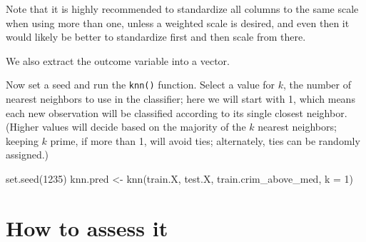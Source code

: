 \documentclass[
]{book}
\newenvironment{Shaded}{\begin{snugshade}}{\end{snugshade}}
\newcommand{\AttributeTok}[1]{\textcolor[rgb]{0.77,0.63,0.00}{#1}}
\newcommand{\CommentTok}[1]{\textcolor[rgb]{0.56,0.35,0.01}{\textit{#1}}}
\newcommand{\DecValTok}[1]{\textcolor[rgb]{0.00,0.00,0.81}{#1}}
\newcommand{\FunctionTok}[1]{\textcolor[rgb]{0.00,0.00,0.00}{#1}}
\newcommand{\NormalTok}[1]{#1}
\newcommand{\OtherTok}[1]{\textcolor[rgb]{0.56,0.35,0.01}{#1}}
\newcommand{\SpecialCharTok}[1]{\textcolor[rgb]{0.00,0.00,0.00}{#1}}
\begin{document}
Note that it is highly recommended to standardize all columns to the same scale when using more than one, unless a weighted scale is desired, and even then it would likely be better to standardize first and then scale from there.

\begin{Shaded}
\end{Shaded}

We also extract the outcome variable into a vector.

\begin{Shaded}
\end{Shaded}

Now set a seed and run the \texttt{knn()} function. Select a value for \(k\), the number of nearest neighbors to use in the classifier; here we will start with 1, which means each new observation will be classified according to its single closest neighbor. (Higher values will decide based on the majority of the \(k\) nearest neighbors; keeping \(k\) prime, if more than 1, will avoid ties; alternately, ties can be randomly assigned.)

\begin{Shaded}
\begin{Highlighting}[]
\FunctionTok{set.seed}\NormalTok{(}\DecValTok{1235}\NormalTok{)}
\NormalTok{knn.pred }\OtherTok{\textless{}{-}} \FunctionTok{knn}\NormalTok{(train.X, test.X, train.crim\_above\_med, }\AttributeTok{k =} \DecValTok{1}\NormalTok{)}
\end{Highlighting}
\end{Shaded}

\hypertarget{how-to-assess-it-6}{%
\section{How to assess it}\label{how-to-assess-it-6}}
\end{document}

